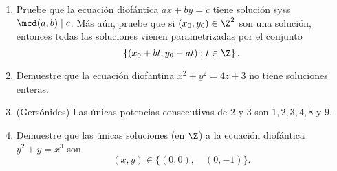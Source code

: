 \documentclass[11pt, reqno]{amsart}
\begin{document}
\begin{enumerate}
	\item\lookright
		Pruebe que la ecuación diofántica $ax + by = c$ tiene solución syss $\mcd(a, b) \mid c$.
		Más aún, pruebe que si $(x_0, y_0) \in \Z^2$ son una solución, entonces todas las soluciones vienen parametrizadas por el
		conjunto
		\[
			\left\{ ( x_0 + bt, y_0 - at ) : t \in \Z \right\}.
		\] %

	\item Demuestre que la ecuación diofantina $x^2 + y^2 = 4z + 3$ no tiene soluciones enteras.

	\item (Gersónides)
		Las únicas potencias consecutivas de $2$ y $3$ son $1, 2, 3, 4, 8$ y $9$.

	\item Demuestre que las únicas soluciones (en $\Z$) a la ecuación diofántica $y^2 + y = x^3$ son
		\[
			(x, y) \in \{ (0, 0), \quad (0, -1) \}.
		\] %







\end{enumerate}
\end{document}

